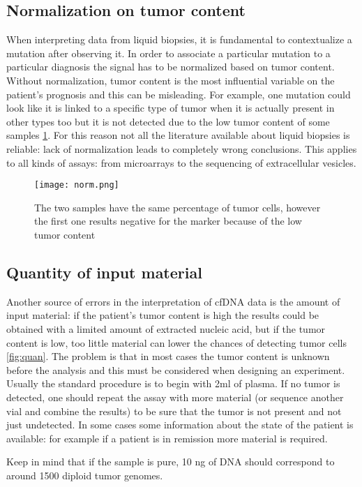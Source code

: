 \subsection{Normalization on tumor content}
When interpreting data from liquid biopsies, it is fundamental to contextualize a mutation after observing it. In order to associate a particular mutation to a particular diagnosis the signal has to be normalized based on tumor content. Without normalization, tumor content is the most influential variable on the patient's prognosis and this can be misleading. For example, one mutation could look like it is linked to a specific type of tumor when it is actually present in other types too but it is not detected due to the low tumor content of some samples \ref{fig:norm}. For this reason not all the literature available about liquid biopsies is reliable: lack of normalization leads to completely wrong conclusions. This applies to all kinds of assays: from microarrays to the sequencing of extracellular vesicles. \\

\begin{figure}[H]
    \texttt{[image: norm.png]}
    \caption{\label{fig:norm}The two samples have the same percentage of tumor cells, however the first one results negative for the marker because of the low tumor content}
\end{figure}

\subsection{Quantity of input material}
Another source of errors in the interpretation of cfDNA data is the amount of input material: if the patient's tumor content is high the results could be obtained with a limited amount of extracted nucleic acid, but if the tumor content is low, too little material can lower the chances of detecting tumor cells \ref{fig:quan}. The problem is that in most cases the tumor content is unknown before the analysis and this must be considered when designing an experiment. Usually the standard procedure is to begin with 2ml of plasma. If no tumor is detected, one should repeat the assay with more material (or sequence another vial and combine the results) to be sure that the tumor is not present and not just undetected. In some cases some information about the state of the patient is available: for example if a patient is in remission more material is required.

Keep in mind that if the sample is pure, 10 ng of DNA should correspond to around 1500 diploid tumor genomes.


